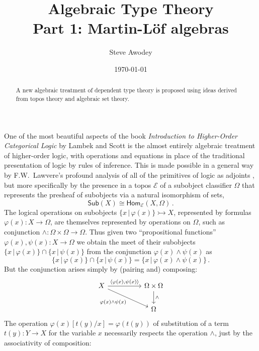 \documentclass[12pt,reqno]{amsart}
\newcommand{\EE}{\ensuremath{\mathcal{E}}}
\newcommand{\Hom}{\ensuremath{\mathsf{Hom}}}
\newcommand{\mono}{\ensuremath{\rightarrowtail}}
\renewcommand{\to}{\ensuremath{\rightarrow}}
\theoremstyle{remark}
\theoremstyle{definition}
\begin{document}

\title{Algebraic Type Theory\\
Part 1: {M}artin-{L}\"of algebras}
\author{Steve Awodey}
\date{\today}

\begin{abstract}
A new algebraic treatment of dependent type theory is proposed using ideas derived from topos theory and algebraic set theory.
\end{abstract}
\maketitle

One of the most beautiful aspects of the book \emph{Introduction to Higher-Order Categorical Logic} by Lambek and Scott is the almost entirely algebraic treatment of higher-order logic, with operations and equations in place of the traditional presentation of logic by rules of inference.   This is made possible in a general way by F.W.\ Lawvere's profound analysis of all of the primitives of logic as adjoints \cite{Lawvere:adjointness}, but more specifically by the presence in a topos $\EE$ of a subobject classifier $\Omega$ that represents the presheaf of subobjects via a natural isomorphism of sets,
\[
\mathsf{Sub}(X) \cong \Hom_{\EE}(X, \Omega)\,.
\]
The logical operations on subobjects $\{x\,|\, \varphi(x)\} \mono X$, represented by formulas $\varphi(x) : X \to \Omega$, are themselves represented by operations on $\Omega$, such as conjunction $\wedge : \Omega \times \Omega \to \Omega$.  Thus given two ``propositional functions'' $\varphi(x), \psi(x) : X \to \Omega$ we obtain the meet of their subobjects $\{x\,|\, \varphi(x)\}\cap \{x\,|\, \psi(x)\}$ from the conjunction $\varphi(x)\wedge\psi(x)$ as 
\[
\{x\,|\, \varphi(x)\}\cap \{x\,|\, \psi(x)\} = \{x\,|\, \varphi(x) \wedge \psi(x)\} \,.
\]
But the conjunction arises simply by (pairing and) composing:
\begin{equation*}
\begin{tikzcd}
 X \ar[rr, "{\langle \varphi(x), \psi(x) \rangle}" ] \ar[rrd,swap,  "\varphi(x)\wedge\psi(x)"] && \Omega \times \Omega \ar[d, "\wedge"] \\
 && \Omega 
\end{tikzcd}
\end{equation*}
The operation $\varphi(x)[t(y)/x] = \varphi(t(y))$ of substitution of a term $t(y) : Y\to X$ for the variable $x$ necessarily respects the operation $\wedge$, just by the associativity of composition:
\end{document}
